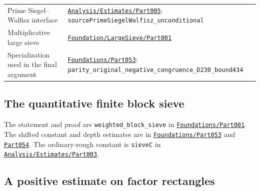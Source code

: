 \begin{longtable}[]{@{}
  >{\raggedright\arraybackslash}p{}
  >{\raggedright\arraybackslash}p{}@{}}
Prime Siegel--Walfisz interface &
\href{../Green64/Library/Analysis/Estimates/Part005.lean}{\nolinkurl{Analysis/Estimates/Part005}}:
{\small\nolinkurl{sourcePrimeSiegelWalfisz_unconditional}} \\
Multiplicative large sieve &
\href{../Green64/Library/Sieve/Foundation/LargeSieve/Part001.lean}{\nolinkurl{Foundation/LargeSieve/Part001}} \\
Specialization used in the final argument &
\href{../Green64/Library/Sieve/Foundations/Part053.lean}{\nolinkurl{Foundations/Part053}}:
{\small\nolinkurl{parity_original_negative_congruence_D230_bound434}} \\
\end{longtable}


\hypertarget{block-sieve-source-correspondence}{%
\subsection{The quantitative finite block
sieve}\label{block-sieve-source-correspondence}}

The statement and proof are {\small\nolinkurl{weighted_block_sieve}} in
\href{../Green64/Library/Sieve/Foundations/Part001.lean}{\nolinkurl{Foundations/Part001}}.
The shifted constant and depth estimates are in
\href{../Green64/Library/Sieve/Foundations/Part053.lean}{\nolinkurl{Foundations/Part053}}
and
\href{../Green64/Library/Sieve/Foundations/Part054.lean}{\nolinkurl{Part054}}.
The ordinary-rough constant is {\small\nolinkurl{sieveC}} in
\href{../Green64/Library/Analysis/Estimates/Part003.lean}{\nolinkurl{Analysis/Estimates/Part003}}.


\hypertarget{rectangles-source-correspondence}{%
\subsection{A positive estimate on factor
rectangles}\label{rectangles-source-correspondence}}

